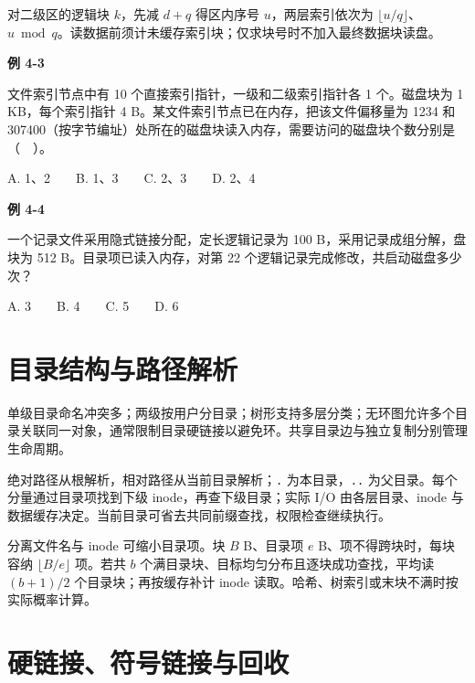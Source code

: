 对二级区的逻辑块 \(k\)，先减 \(d+q\) 得区内序号 \(u\)，两层索引依次为 \(\lfloor u/q\rfloor\)、\(u\bmod q\)。读数据前须计未缓存索引块；仅求块号时不加入最终数据块读盘。

\par\medskip{}\noindent\hypertarget{OS04-E03}{}\label{OS04-E03}\textbf{例 4-3}\par\nobreak\smallskip

文件索引节点中有 10 个直接索引指针，一级和二级索引指针各 1 个。磁盘块为 1 KB，每个索引指针 4 B。某文件索引节点已在内存，把该文件偏移量为 1234 和 307400（按字节编址）处所在的磁盘块读入内存，需要访问的磁盘块个数分别是（　）。

A. 1、2　　B. 1、3　　C. 2、3　　D. 2、4

\par\medskip{}\noindent\hypertarget{OS04-E04}{}\label{OS04-E04}\textbf{例 4-4}\par\nobreak\smallskip

一个记录文件采用隐式链接分配，定长逻辑记录为 100 B，采用记录成组分解，盘块为 512 B。目录项已读入内存，对第 22 个逻辑记录完成修改，共启动磁盘多少次？

A. 3　　B. 4　　C. 5　　D. 6

\section{目录结构与路径解析}\label{OS04-directory}

单级目录命名冲突多；两级按用户分目录；树形支持多层分类；无环图允许多个目录关联同一对象，通常限制目录硬链接以避免环。共享目录边与独立复制分别管理生命周期。

绝对路径从根解析，相对路径从当前目录解析；\texttt{.\allowbreak{}} 为本目录，\texttt{.\allowbreak{}.\allowbreak{}} 为父目录。每个分量通过目录项找到下级 inode，再查下级目录；实际 I/O 由各层目录、inode 与数据缓存决定。当前目录可省去共同前缀查找，权限检查继续执行。

分离文件名与 inode 可缩小目录项。块 \(B\) B、目录项 \(e\) B、项不得跨块时，每块容纳 \(\lfloor B/e\rfloor\) 项。若共 \(b\) 个满目录块、目标均匀分布且逐块成功查找，平均读 \((b+1)/2\) 个目录块；再按缓存补计 inode 读取。哈希、树索引或末块不满时按实际概率计算。

\section{硬链接、符号链接与回收}\label{OS04-links}

